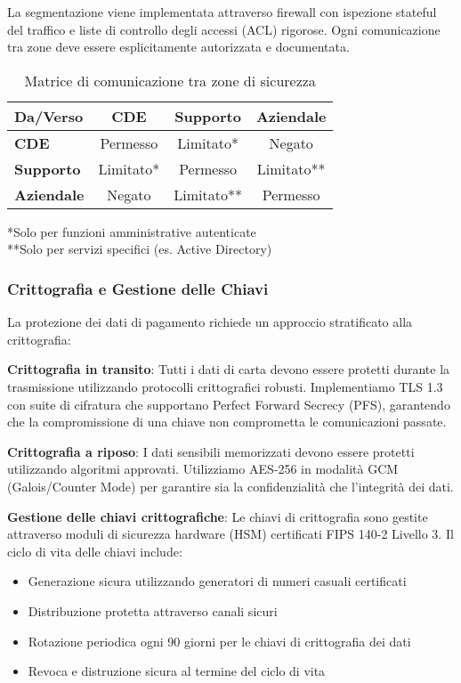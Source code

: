 La segmentazione viene implementata attraverso firewall con ispezione stateful del traffico e liste di controllo degli accessi (ACL) rigorose. Ogni comunicazione tra zone deve essere esplicitamente autorizzata e documentata.

\begin{table}[h]
\centering
\caption{Matrice di comunicazione tra zone di sicurezza}
\label{tab:matrice_comunicazione}
\begin{tabular}{|l|c|c|c|}
\hline
\textbf{Da/Verso} & \textbf{CDE} & \textbf{Supporto} & \textbf{Aziendale} \\
\hline
\textbf{CDE} & Permesso & Limitato* & Negato \\
\hline
\textbf{Supporto} & Limitato* & Permesso & Limitato** \\
\hline
\textbf{Aziendale} & Negato & Limitato** & Permesso \\
\hline
\end{tabular}
\vspace{0.5cm}
\small{*Solo per funzioni amministrative autenticate\\
**Solo per servizi specifici (es. Active Directory)}
\end{table}

\subsubsection{Crittografia e Gestione delle Chiavi}

La protezione dei dati di pagamento richiede un approccio stratificato alla crittografia:

\textbf{Crittografia in transito}: Tutti i dati di carta devono essere protetti durante la trasmissione utilizzando protocolli crittografici robusti. Implementiamo TLS 1.3 con suite di cifratura che supportano Perfect Forward Secrecy (PFS), garantendo che la compromissione di una chiave non comprometta le comunicazioni passate.

\textbf{Crittografia a riposo}: I dati sensibili memorizzati devono essere protetti utilizzando algoritmi approvati. Utilizziamo AES-256 in modalità GCM (Galois/Counter Mode) per garantire sia la confidenzialità che l'integrità dei dati.

\textbf{Gestione delle chiavi crittografiche}: Le chiavi di crittografia sono gestite attraverso moduli di sicurezza hardware (HSM) certificati FIPS 140-2 Livello 3. Il ciclo di vita delle chiavi include:
\begin{itemize}
    \item Generazione sicura utilizzando generatori di numeri casuali certificati
    \item Distribuzione protetta attraverso canali sicuri
    \item Rotazione periodica ogni 90 giorni per le chiavi di crittografia dei dati
    \item Revoca e distruzione sicura al termine del ciclo di vita
\end{itemize}

